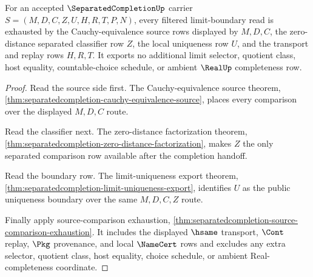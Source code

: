 \begin{theorem}
\label{thm:separatedcompletion-filtered-limit-boundary}
For an accepted $\SeparatedCompletionUp$ carrier $S=(M,D,C,Z,U,H,R,T,P,N)$, every filtered limit-boundary read is exhausted by the Cauchy-equivalence source rows displayed by $M,D,C$, the zero-distance separated classifier row $Z$, the local uniqueness row $U$, and the transport and replay rows $H,R,T$. It exports no additional limit selector, quotient class, host equality, countable-choice schedule, or ambient $\RealUp$ completeness row.
\end{theorem}
\begin{proof}
Read the source side first. The Cauchy-equivalence source theorem, \autoref{thm:separatedcompletion-cauchy-equivalence-source}, places every comparison over the displayed $M,D,C$ route.

Read the classifier next. The zero-distance factorization theorem, \autoref{thm:separatedcompletion-zero-distance-factorization}, makes $Z$ the only separated comparison row available after the completion handoff.

Read the boundary row. The limit-uniqueness export theorem, \autoref{thm:separatedcompletion-limit-uniqueness-export}, identifies $U$ as the public uniqueness boundary over the same $M,D,C,Z$ route.

Finally apply source-comparison exhaustion, \autoref{thm:separatedcompletion-source-comparison-exhaustion}. It includes the displayed $\hsame$ transport, $\Cont$ replay, $\Pkg$ provenance, and local $\NameCert$ rows and excludes any extra selector, quotient class, host equality, choice schedule, or ambient Real-completeness coordinate.
\end{proof}

